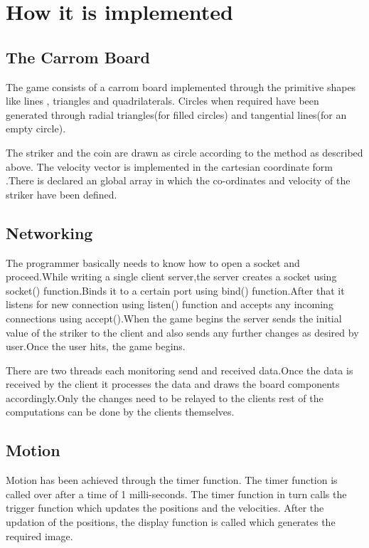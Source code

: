 \documentclass{article}
\begin{document}
\section*{How it is  implemented}
\subsection*{The Carrom Board}
\item The game consists of a carrom board implemented through the primitive shapes like lines , triangles and quadrilaterals. Circles when required have been generated through radial triangles(for filled circles) and tangential lines(for an empty circle).
\item The striker and the coin are drawn as circle according to the method as described above. The velocity vector is implemented in the cartesian coordinate  form .There is declared an global array in which the co-ordinates and velocity of the striker have been defined.
\subsection*{Networking}
\item  The programmer basically needs to know how to open a socket and proceed.While writing a single client server,the server creates a socket using socket() function.Binds it to a certain port using bind() function.After that it listens for new connection using listen() function and accepts any incoming connections using accept().When the game begins the server sends the initial value of the striker to the client and also sends any further changes as desired by user.Once the user hits, the game begins.
\item There are two threads each monitoring send and received data.Once the data is received by the client it processes the data and draws the board components accordingly.Only the changes need to be relayed to the clients rest of the computations can be done by the clients themselves.
\subsection*{Motion}
\item Motion has been achieved through the timer function. The timer function is called over after a time of 1 milli-seconds. The timer function in turn calls the trigger function which updates the positions and the velocities. After the updation of the positions, the display function is called which generates the required image.
\end{document}
